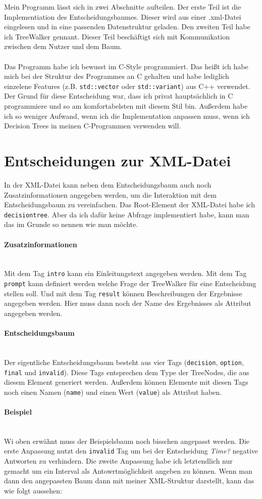 \documentclass[a4paper,12pt]{article}
\newcommand{\myparagraph}[1]{\paragraph*{#1}\mbox{}\\}
\begin{document}
Mein Programm lässt sich in zwei Abschnitte aufteilen. Der erste Teil ist die Implementiation des Entscheidungsbaumes. Dieser wird aus einer .xml-Datei eingelesen und in eine passenden Datenstruktur geladen. 
Den zweiten Teil habe ich TreeWalker gennant. Dieser Teil beschäftigt sich mit Kommunikation zwischen dem Nutzer und dem Baum. 
\\
\\
Das Programm habe ich bewusst im C-Style programmiert. Das heißt ich habe mich bei der Struktur des Programmes an C gehalten und habe lediglich einzelene Features (z.B. \texttt{std::vector} oder \texttt{std::variant}) aus C++ verwendet.
Der Grund für diese Entscheidung war, dass ich privat hauptsächlich in C programmiere und so am komfortabelsten mit diesem Stil bin. Außerdem habe ich so weniger Aufwand, wenn ich die Implementation anpassen muss, wenn ich Decision Trees in meinen C-Programmen verwenden will.

\section*{Entscheidungen zur XML-Datei}
In der XML-Datei kann neben dem Entscheidungsbaum auch noch Zusatzinformationen angegeben werden, um die Interaktion mit dem Entscheidungsbaum zu vereinfachen. 
Das Root-Element der XML-Datei habe ich \texttt{decisiontree}. Aber da ich dafür keine Abfrage implementiert habe, kann man das im Grunde so nennen wie man möchte.

\myparagraph{Zusatzinformationen}
Mit dem Tag \texttt{intro} kann ein Einleitungstext angegeben werden. 
Mit dem Tag \texttt{prompt} kann definiert werden welche Frage der TreeWalker für eine Entscheidung stellen soll.
Und mit dem Tag \texttt{result} können Beschreibungen der Ergebnisse angegeben werden. Hier muss dann noch der Name des Ergebnisses als Attribut angegeben werden.

\myparagraph{Entscheidungsbaum}
Der eigentliche Entscheidungsbaum besteht aus vier Tags (\texttt{decision}, \texttt{option}, \texttt{final} und \texttt{invalid}). 
Diese Tags entsprechen dem Type der TreeNodes, die aus diesem Element generiert werden.
Außerdem können Elemente mit diesen Tags noch einen Namen (\texttt{name}) und einen Wert (\texttt{value}) als Attribut haben.

\myparagraph{Beispiel}
Wi oben erwähnt muss der Beispielsbaum noch bisschen angepasst werden. 
Die erste Anpassung nutzt den \texttt{invalid} Tag um bei der Entscheidung \emph{Time?} negative Antworten zu verhindern.
Die zweite Anpassung habe ich letztendlich nur gemacht um ein Interval als Antowrtmöglichkeit angeben zu können.
Wenn man dann den angepassten Baum dann mit meiner XML-Struktur darstellt, kann das wie folgt aussehen:
\end{document}

